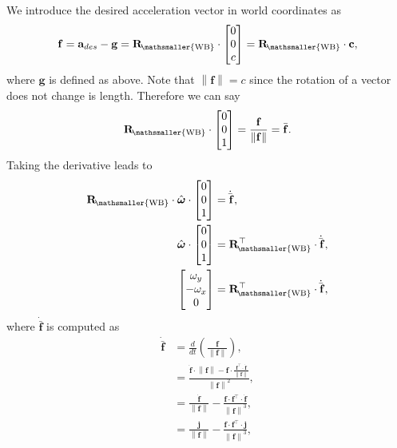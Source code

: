 \documentclass[10pt,a4paper,fleqn]{article}
\newcommand{\bVec}[1]{\mathbf{#1}}
\newcommand{\norm}[1]{\left\lVert#1\right\rVert}
\newcommand{\ori}[1]{\bVec{R}_{\!\mathsmaller{\mathrm{#1}}}} %
\newcommand{\bodyrate}[0]{\omega} %
\newcommand{\bodyrates}[0]{\boldsymbol{\bodyrate}} %
\begin{document}
We introduce the desired acceleration vector in world coordinates as
%
\begin{equation}
	\bVec{f} = \bVec{a}_{des} - \bVec{g} = \ori{WB} \cdot \begin{bmatrix}
		0 \\ 0 \\ c
	\end{bmatrix} = \ori{WB} \cdot \bVec{c},
\end{equation}
%
where $\bVec{g}$ is defined as above.
Note that $\norm{\bVec{f}} = c$ since the rotation of a vector does not change is length.
Therefore we can say
%
\begin{equation}
	\ori{WB} \cdot \begin{bmatrix}
		0 \\ 0 \\ 1
	\end{bmatrix} = \frac{\bVec{f}}{\norm{\bVec{f}}} = \bar{\bVec{f}}.
\end{equation}
%
Taking the derivative leads to
%
\begin{align}
	\ori{WB} \cdot \hat{\bodyrates} \cdot \begin{bmatrix}
		0 \\ 0 \\ 1
	\end{bmatrix} &= \dot{\bar{\bVec{f}}}, \\
	\hat{\bodyrates} \cdot \begin{bmatrix}
		0 \\ 0 \\ 1
	\end{bmatrix} &= \ori{WB}^{\top} \cdot \dot{\bar{\bVec{f}}}, \\
	\begin{bmatrix}
		\omega_y \\ -\omega_x \\ 0
	\end{bmatrix} &= \ori{WB}^{\top} \cdot \dot{\bar{\bVec{f}}},
\end{align}
%
where $\dot{\bar{\bVec{f}}}$ is computed as
%
\begin{align}
	\dot{\bar{\bVec{f}}} &= \frac{d}{dt} \left( \frac{\bVec{f}}{\norm{\bVec{f}}} \right), \\
	&= \frac{\dot{\bVec{f}} \cdot \norm{\bVec{f}} - \bVec{f} \cdot \frac{\bVec{f}^{\top} \cdot \dot{\bVec{f}}}{\norm{\bVec{f}}}}{\norm{\bVec{f}}^2}, \\
	&= \frac{\dot{\bVec{f}}}{\norm{\bVec{f}}} - \frac{\bVec{f} \cdot \bVec{f}^{\top} \cdot \dot{\bVec{f}}}{\norm{\bVec{f}}^3}, \\ 
	&= \frac{\bVec{j}}{\norm{\bVec{f}}} - \frac{\bVec{f} \cdot \bVec{f}^{\top} \cdot \bVec{j}}{\norm{\bVec{f}}^3},
\end{align}
\end{document}
